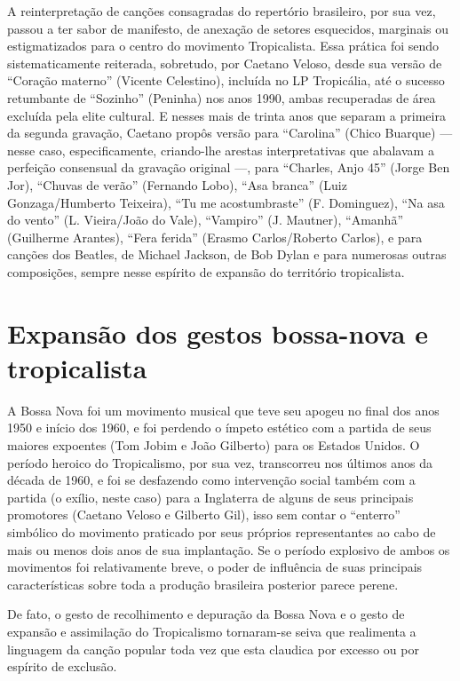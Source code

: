 A reinterpretação de canções consagradas do repertório brasileiro, por
sua vez, passou a ter sabor de manifesto, de anexação de setores
esquecidos, marginais ou estigmatizados para o centro do movimento
Tropicalista. Essa prática foi sendo sistematicamente reiterada,
sobretudo, por Caetano Veloso, desde sua versão de ``Coração materno''
(Vicente Celestino), incluída no LP Tropicália, até o sucesso retumbante
de ``Sozinho'' (Peninha) nos anos 1990, ambas recuperadas de área
excluída pela elite cultural. E nesses mais de trinta anos que separam a
primeira da segunda gravação, Caetano propôs versão para ``Carolina''
(Chico Buarque) --- nesse caso, especificamente, criando-lhe arestas
interpretativas que abalavam a perfeição consensual da gravação original
---, para ``Charles, Anjo 45'' (Jorge Ben Jor), ``Chuvas de verão''
(Fernando Lobo), ``Asa branca'' (Luiz Gonzaga/Humberto Teixeira), ``Tu
me acostumbraste'' (F. Dominguez), ``Na asa do vento'' (L. Vieira/João
do Vale), ``Vampiro'' (J. Mautner), ``Amanhã'' (Guilherme Arantes),
``Fera ferida'' (Erasmo Carlos/Roberto Carlos), e para canções dos
Beatles, de Michael Jackson, de Bob Dylan e para numerosas outras
composições, sempre nesse espírito de expansão do território
tropicalista.~

\section{Expansão dos gestos bossa-nova e tropicalista}

A Bossa Nova foi um movimento musical que teve seu apogeu no final dos
anos 1950 e início dos 1960, e foi perdendo o ímpeto estético com a
partida de seus maiores expoentes (Tom Jobim e João Gilberto) para os
Estados Unidos. O período heroico do Tropicalismo, por sua vez,
transcorreu nos últimos anos da década de 1960, e foi se desfazendo como
intervenção social também com a partida (o exílio, neste caso) para a
Inglaterra de alguns de seus principais promotores (Caetano Veloso e
Gilberto Gil), isso sem contar o ``enterro'' simbólico do movimento
praticado por seus próprios representantes ao cabo de mais ou menos dois
anos de sua implantação. Se o período explosivo de ambos os movimentos
foi relativamente breve, o poder de influência de suas principais
características sobre toda a produção brasileira posterior parece
perene.

De fato, o gesto de recolhimento e depuração da Bossa Nova e o gesto de
expansão e assimilação do Tropicalismo tornaram-se seiva que realimenta
a linguagem da canção popular toda vez que esta claudica por excesso ou
por espírito de exclusão.

